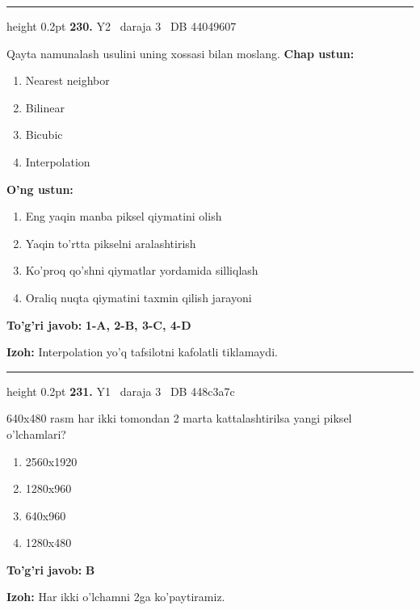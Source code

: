 \documentclass[10pt,a4paper,oneside]{article}
\begin{document}
\vspace{2mm}\hrule height 0.2pt \vspace{4mm}
\hypertarget{q230}{\textbf{\color{ink}230.}}  {\color{muted}\scriptsize Y2 \textbullet\ daraja 3 \textbullet\ DB 44049607}
\par
Qayta namunalash usulini uning xossasi bilan moslang.
\textbf{\footnotesize Chap ustun:}
\begin{enumerate}[label=\arabic*),leftmargin=9mm]
\item Nearest neighbor
\item Bilinear
\item Bicubic
\item Interpolation
\end{enumerate}
\textbf{\footnotesize O'ng ustun:}
\begin{enumerate}[label=\Alph*),leftmargin=9mm]
\item Eng yaqin manba piksel qiymatini olish
\item Yaqin to'rtta pikselni aralashtirish
\item Ko'proq qo'shni qiymatlar yordamida silliqlash
\item Oraliq nuqta qiymatini taxmin qilish jarayoni
\end{enumerate}
\begin{tcolorbox}[enhanced,breakable,colback=teal!4,colframe=teal!45!black,boxrule=0.45pt,arc=1.2mm,left=2.8mm,right=2.8mm,top=2mm,bottom=2mm,before skip=2mm,after skip=2mm]
\textbf{\color{teal}To'g'ri javob:} \textbf{1-A, 2-B, 3-C, 4-D}
\par\smallskip
\textbf{Izoh:} Interpolation yo'q tafsilotni kafolatli tiklamaydi.
\end{tcolorbox}
\vspace{2mm}\hrule height 0.2pt \vspace{4mm}
\hypertarget{q231}{\textbf{\color{ink}231.}}  {\color{muted}\scriptsize Y1 \textbullet\ daraja 3 \textbullet\ DB 448c3a7c}
\par
640x480 rasm har ikki tomondan 2 marta kattalashtirilsa yangi piksel o'lchamlari?
\begin{enumerate}[label=\Alph*),leftmargin=9mm]
\item 2560x1920
\item 1280x960
\item 640x960
\item 1280x480
\end{enumerate}
\begin{tcolorbox}[enhanced,breakable,colback=teal!4,colframe=teal!45!black,boxrule=0.45pt,arc=1.2mm,left=2.8mm,right=2.8mm,top=2mm,bottom=2mm,before skip=2mm,after skip=2mm]
\textbf{\color{teal}To'g'ri javob:} \textbf{B}
\par\smallskip
\textbf{Izoh:} Har ikki o'lchamni 2ga ko'paytiramiz.
\end{tcolorbox}
\end{document}
